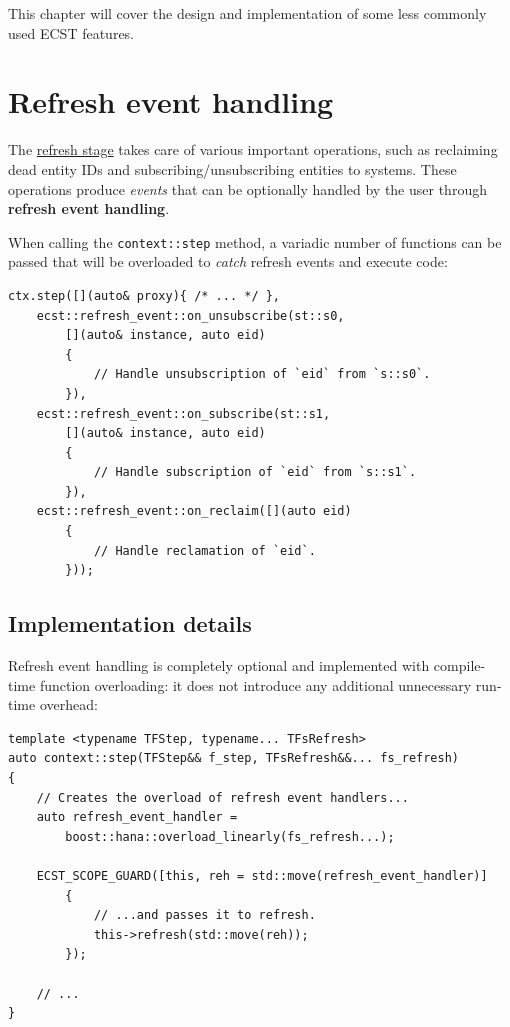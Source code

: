 \documentclass[twoside, 12pt, a4paper, openright]{book}
\begin{document}
This chapter will cover the design and implementation of some less
commonly used ECST features.

\hypertarget{advf_refresh_event_handling}{\section{Refresh event
handling}\label{advf_refresh_event_handling}}

The \protect\hyperlink{flow_refresh}{refresh stage} takes care of
various important operations, such as reclaiming dead entity IDs and
subscribing/unsubscribing entities to systems. These operations produce
\emph{events} that can be optionally handled by the user through
\textbf{refresh event handling}.

When calling the
\texttt{context::step}
method, a variadic number of functions can be passed that will be
overloaded to \emph{catch} refresh events and execute code:

\begin{verbatim}
ctx.step([](auto& proxy){ /* ... */ },
    ecst::refresh_event::on_unsubscribe(st::s0,
        [](auto& instance, auto eid)
        {
            // Handle unsubscription of `eid` from `s::s0`.
        }),
    ecst::refresh_event::on_subscribe(st::s1,
        [](auto& instance, auto eid)
        {
            // Handle subscription of `eid` from `s::s1`.
        }),
    ecst::refresh_event::on_reclaim([](auto eid)
        {
            // Handle reclamation of `eid`.
        }));
\end{verbatim}

\subsection{Implementation details}\label{implementation-details-1}

Refresh event handling is completely optional and implemented with
compile-time function overloading: it does not introduce any additional
unnecessary run-time overhead:

\begin{verbatim}
template <typename TFStep, typename... TFsRefresh>
auto context::step(TFStep&& f_step, TFsRefresh&&... fs_refresh)
{
    // Creates the overload of refresh event handlers...
    auto refresh_event_handler =
        boost::hana::overload_linearly(fs_refresh...);

    ECST_SCOPE_GUARD([this, reh = std::move(refresh_event_handler)]
        {
            // ...and passes it to refresh.
            this->refresh(std::move(reh));
        });

    // ...
}
\end{verbatim}
\end{document}
